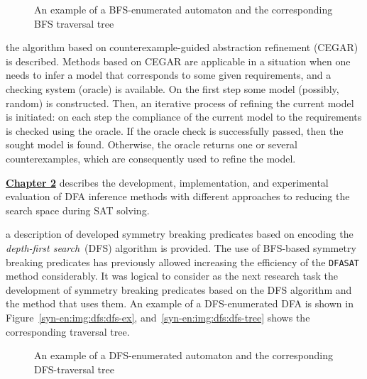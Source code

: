 \begin{figure}[ht]
  \centering
  \hfill
  \caption{An example of a BFS-enumerated automaton and the corresponding BFS traversal tree}
  \label{syn-en:img:bfs}
\end{figure}

\insectionen{\ref{sec:review:cegar}} the algorithm based on counterexample-guided abstraction refinement (CEGAR) is described.
Methods based on CEGAR are applicable in a situation when one needs to infer a model that corresponds to some given requirements, and a checking system (oracle) is available.
On the first step some model (possibly, random) is constructed.
Then, an iterative process of refining the current model is initiated: on each step the compliance of the current model to the requirements is checked using the oracle.
If the oracle check is successfully passed, then the sought model is found.
Otherwise, the oracle returns one or several counterexamples, which are consequently used to refine the model.


\textbf{\underline{Chapter 2}} describes the development, implementation, and experimental evaluation of DFA inference methods with different approaches to reducing the 
search space during SAT solving.

\insectionen{\ref{sec:space:dfs}} a description of developed symmetry breaking predicates based on encoding the \emph{depth-first search}~(DFS) algorithm is provided.
The use of BFS-based symmetry breaking predicates has previously allowed increasing the efficiency of the \texttt{DFASAT} method considerably.
It was logical to consider as the next research task the development of symmetry breaking predicates based on the DFS algorithm and the method that uses them.
An example of a DFS-enumerated DFA is shown in Figure~\ref{syn-en:img:dfs:dfs-ex}, and~\ref{syn-en:img:dfs:dfs-tree} shows the corresponding traversal tree.

\begin{figure}[ht]
  \centering
  \hfill
  \caption{An example of a DFS-enumerated automaton and the corresponding DFS-traversal tree}
  \label{syn-en:img:dfs}
\end{figure}


